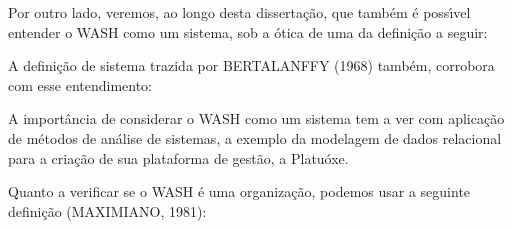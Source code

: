 \documentclass[
12pt,		%
openright,	%
twoside,  %
a4paper,			%
chapter=TITLE,		%
english,			%
french,				%
spanish,			%
brazil				%
]{USPSC-classe/USPSC}
\begin{document}
Por outro lado, veremos, ao longo desta disserta\c{c}\~ao, que tamb\'em \'e poss\'{\i}vel entender o WASH como um sistema, sob a \'otica de uma da defini\c{c}\~ao a seguir:


















\noindent\begin{center}\mbox{\centering{}}\end{center}


A defini\c{c}\~ao de sistema trazida por BERTALANFFY (1968) tamb\'em, corrobora com esse entendimento:


















\noindent\begin{center}\mbox{\centering{}}\end{center}


A import\^ancia de considerar o WASH como um sistema tem a ver com aplica\c{c}\~ao de m\'etodos de an\'alise de sistemas, a exemplo da modelagem de dados relacional para a cria\c{c}\~ao de sua plataforma de gest\~ao, a \textquotedbl Platu\'oxe\textquotedbl .

















Quanto a verificar se o WASH \'e uma organiza\c{c}\~ao, podemos usar a seguinte defini\c{c}\~ao  (MAXIMIANO, 1981):
\end{document}
